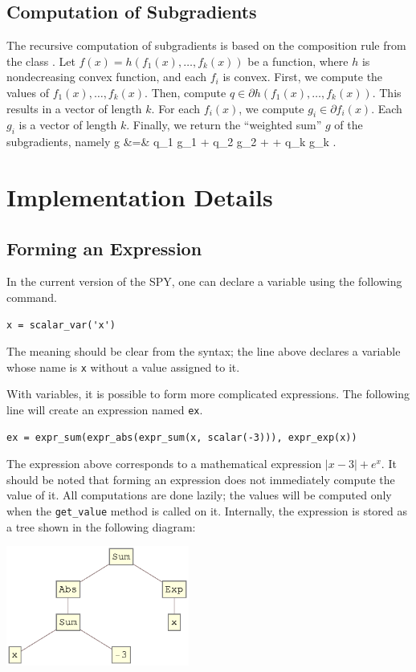 \documentclass[12pt]{article}
\begin{document}
\subsection{Computation of Subgradients}
The recursive computation of subgradients is based on the composition rule from the class \cite{subg}. Let $f(x) = h(f_1(x), \ldots, f_k(x))$ be a function, where $h$ is nondecreasing convex function, and each $f_i$ is convex. First, we compute the values of $f_1(x), \ldots, f_k(x)$. Then, compute $q \in \partial h(f_1(x), \ldots, f_k(x))$. This results in a vector of length $k$. For each $f_i(x)$, we compute $g_i \in \partial f_i(x)$. Each $g_i$ is a vector of length $k$. Finally, we return the ``weighted sum'' $g$ of the subgradients, namely
\BEAS
g &=& q_1 g_1 + q_2 g_2 + \cdots + q_k g_k \; .
\EEAS

\section{Implementation Details}
\subsection{Forming an Expression}
In the current version of the SPY, one can declare a variable using the following command.
\begin{verbatim}
x = scalar_var('x')
\end{verbatim}
The meaning should be clear from the syntax; the line above declares a variable whose name is \verb'x' without a value assigned to it.

With variables, it is possible to form more complicated expressions. The following line will create an expression named \verb'ex'.
\begin{verbatim}
ex = expr_sum(expr_abs(expr_sum(x, scalar(-3))), expr_exp(x))
\end{verbatim}
The expression above corresponds to a mathematical expression $|x-3|+e^x$. It should be noted that forming an expression does not immediately compute the value of it. All computations are done lazily; the values will be computed only when the \verb'get_value' method is called on it. Internally, the expression is stored as a tree shown in the following diagram:

\begin{center}
\includegraphics[width=0.45\textwidth]{expr}
\end{center}
\end{document}
